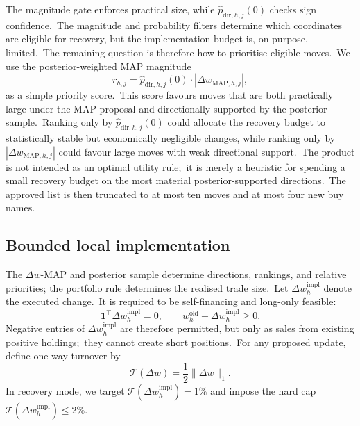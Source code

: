 \documentclass[11pt]{article}
\newcommand{\one}{\mathbf{1}}
\begin{document}
The magnitude gate enforces practical size, while \(\widehat p_{\mathrm{dir},h,j}(0)\) checks sign confidence.\ The magnitude and probability filters determine which coordinates are eligible for recovery, but the implementation budget is, on purpose, limited.\ The remaining question is therefore how to prioritise eligible moves.\ We use the posterior-weighted MAP magnitude
\begin{equation}
  r_{h,j}
  =
  \widehat p_{\mathrm{dir},h,j}(0) \cdot
  |\Delta w_{\mathrm{MAP},h,j}|,
  \label{eq:workflow-recovery-rank}
\end{equation}
as a simple priority score.\ This score favours moves that are both practically
large under the MAP proposal and directionally supported by the posterior sample.\ Ranking only by \(\widehat p_{\mathrm{dir},h,j}(0)\) could allocate the recovery
budget to statistically stable but economically negligible changes, while ranking
only by \(|\Delta w_{\mathrm{MAP},h,j}|\) could favour large moves with weak
directional support.\ The product is not intended as an optimal utility rule;\ it is merely a heuristic for spending a small recovery budget on the most material posterior-supported directions.\ The approved list is then truncated to at most ten moves and at most four new buy names.



\subsection{Bounded local implementation}\label{subsec:workflow-local-implementation}


The \(\Delta w\)-MAP and posterior sample determine directions, rankings, and relative priorities; the portfolio rule determines the realised trade size.\ Let \(\Delta w^{\mathrm{impl}}_h\) denote the executed change.\ It is required to be self-financing and long-only feasible:
\begin{equation}
  \one^\top\Delta w^{\mathrm{impl}}_h=0,
  \qquad
  w^{\mathrm{old}}_h+\Delta w^{\mathrm{impl}}_h\geq0.
  \label{eq:workflow-implemented-feasibility}
\end{equation}
Negative entries of \(\Delta w^{\mathrm{impl}}_h\) are therefore permitted, but only as sales from existing positive holdings;\ they cannot create short positions.\ For any proposed update, define one-way turnover by
\begin{equation}
  \mathcal T(\Delta w)=\frac12\|\Delta w\|_1.
  \label{eq:workflow-one-way-turnover}
\end{equation}
In recovery mode, we target \(\mathcal T(\Delta w^{\mathrm{impl}}_h)=1\%\) and impose the hard cap \(\mathcal T(\Delta w^{\mathrm{impl}}_h)\leq2\%\).
\end{document}

